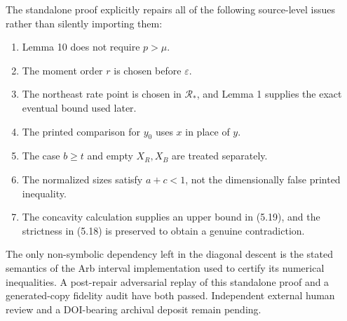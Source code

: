 The standalone proof explicitly repairs all of the following
source-level issues rather than silently importing them:

\begin{enumerate}
\def\labelenumi{\arabic{enumi}.}
\tightlist
\item
  Lemma 10 does not require \(p>\mu\).
\item
  The moment order \(r\) is chosen before \(\varepsilon\).
\item
  The northeast rate point is chosen in \(\mathcal R_*\), and Lemma 1
  supplies the exact eventual bound used later.
\item
  The printed comparison for \(y_0\) uses \(x\) in place of \(y\).
\item
  The case \(b\ge t\) and empty \(X_R,X_B\) are treated separately.
\item
  The normalized sizes satisfy \(a+c<1\), not the dimensionally false
  printed inequality.
\item
  The concavity calculation supplies an upper bound in (5.19), and the
  strictness in (5.18) is preserved to obtain a genuine contradiction.
\end{enumerate}

The only non-symbolic dependency left in the diagonal descent is the
stated semantics of the Arb interval implementation used to certify its
numerical inequalities. A post-repair adversarial replay of this standalone
proof and a generated-copy fidelity audit have both passed. Independent
external human review and a DOI-bearing archival deposit remain pending.

